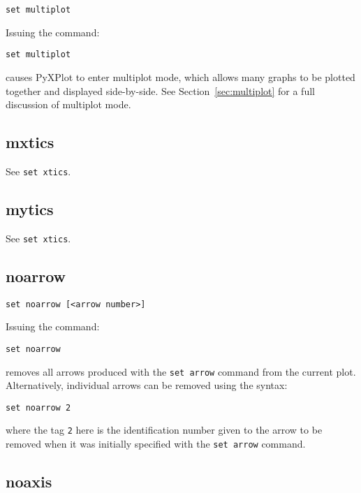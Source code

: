 \begin{verbatim}
set multiplot
\end{verbatim}

Issuing the command:

\begin{verbatim}
set multiplot
\end{verbatim}

\noindent causes PyXPlot to enter multiplot mode, which allows many graphs to
be plotted together and displayed side-by-side. See Section~\ref{sec:multiplot}
for a full discussion of multiplot mode.

\subsection{mxtics}

See {\tt set xtics}.

\subsection{mytics}

See {\tt set xtics}.

\subsection{noarrow}

\begin{verbatim}
set noarrow [<arrow number>]
\end{verbatim}

Issuing the command:

\begin{verbatim}
set noarrow
\end{verbatim}

\noindent removes all arrows produced with the {\tt set arrow} command from the current
plot. Alternatively, individual arrows can be removed using the syntax:

\begin{verbatim}
set noarrow 2
\end{verbatim}

\noindent where the tag {\tt 2} here is the identification number given to
the arrow to be removed when it was initially specified with the {\tt set arrow}
command.

\subsection{noaxis}

